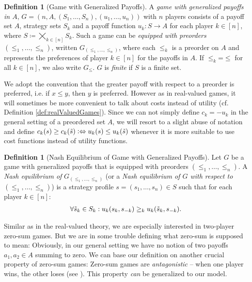 \documentclass[a4paper]{scrreprt}
\theoremstyle{definition}
\newtheorem{defn}[thm]{Definition} %
\begin{document}
    \begin{defn}[Game with Generalized Payoffs]
        A \emph{game with generalized payoffs in $A$}, $G = (n, A, (S_1, \dots, S_n), (u_1, \dots, u_n))$ with $n$ players consists of a payoff set $A$, strategy sets $S_k$ and a payoff function $u_k: S \to A$ for each player $k \in [n]$, where $S \coloneqq \bigtimes_{k \in [n]} S_k$.        
        Such a game can be \emph{equipped with preorders} $(\leq_1, \dots, \leq_n)$, written $G_{(\leq_1, \dots, \leq_n)}$, where each $\leq_k$ is a preorder on $A$ and represents the preferences of player $k \in [n]$ for the payoffs in $A$.
        If $\leq_k \mathbin{=} \leq$ for all $k \in [n]$, we also write $G_\leq$.
        $G$ is \emph{finite} if $S$ is a finite set.
    \end{defn}
    We adopt the convention that the greater payoff with respect to a preorder is preferred, i.e. if $x \leq y$, then $y$ is preferred. However as in real-valued games, it will sometimes be more convenient to talk about costs instead of utility (cf. Definition \ref{def:realValuedGames}). Since we can not simply define $c_k = -u_k$ in the general setting of a preordered set $A$, we will resort to a slight abuse of notation and define $c_k(s) \geq c_k(\tilde{s}) \mathrel{\vcentcolon\Leftrightarrow} u_k(s) \leq u_k(\tilde{s})$ whenever it is more suitable to use cost functions instead of utility functions.
    
    \begin{defn}[Nash Equilibrium of Game with Generalized Payoffs]
        Let $G$ be a game with generalized payoffs that is equipped with preorders $(\leq_1, \dots, \leq_n)$.
        A \emph{Nash equilibrium of} $G_{(\leq_1, \dots, \leq_n)}$ (or a \emph{Nash equilibrium of $G$ with respect to $(\leq_1, \dots, \leq_n)$})
        is a strategy profile $s = (s_1, \dots, s_n) \in S$ such that for each player $k \in [n]$:
        \begin{gather}
            \forall \tilde{s}_k \in S_k: u_k(s_k, s_{-k}) \geq_k u_k(\tilde{s}_k, s_{-k}).
            \label{eq:nashEquilibriumGeneralizedPayoffs}
        \end{gather}
    \end{defn}
    
    Similar as in the real-valued theory, we are especially interested in two-player zero-sum games.
    But we are in some trouble defining what zero-sum is supposed to mean: Obviously, in our general setting we have no notion of two payoffs $a_1, a_2 \in A$ summing to zero.
    We can base our definition on another crucial property of zero-sum games: Zero-sum games are \emph{antagonistic} -- when one player wins, the other loses (see \cite{bib:andersonAntagonisticGames}). This property \emph{can} be generalized to our model.
    
\end{document}
